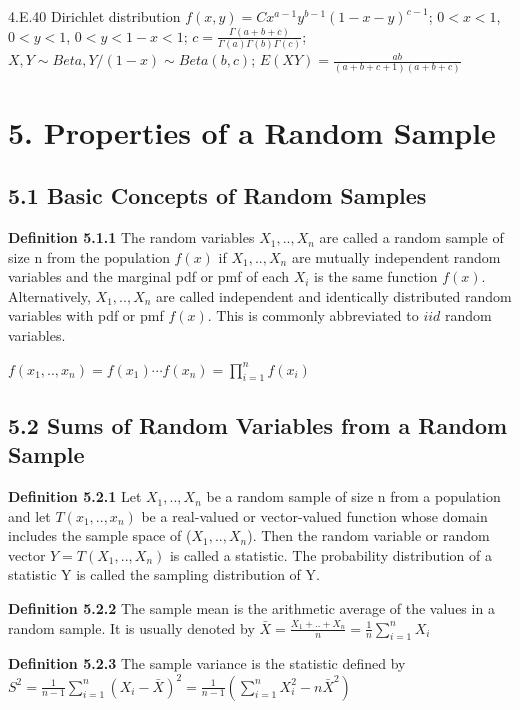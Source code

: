 \documentclass[10pt,twocolumn,portrait]{article}
\begin{document}
4.E.40 Dirichlet distribution \(f(x,y)=Cx^{a-1}y^{b-1}(1-x-y)^{c-1}\);
\(0<x<1\), \(0<y<1\), \(0<y<1-x<1\);
\(c=\frac{\Gamma(a+b+c)}{\Gamma(a)\Gamma(b)\Gamma(c)}\);
\(X,Y\sim Beta, Y/(1-x)\sim Beta(b,c)\);
\(E(XY)=\frac{ab}{(a+b+c+1)(a+b+c)}\)

\hypertarget{samp}{%
\section{5. Properties of a Random Sample}\label{samp}}

\hypertarget{basic-concepts-of-random-samples}{%
\subsection{5.1 Basic Concepts of Random
Samples}\label{basic-concepts-of-random-samples}}

\textbf{Definition 5.1.1} The random variables \(X_1,..,X_n\) are called
a random sample of size n from the population \(f(x)\) if \(X_1,..,X_n\)
are mutually independent random variables and the marginal pdf or pmf of
each \(X_i\) is the same function \(f(x)\). Alternatively,
\(X_1,..,X_n\) are called independent and identically distributed random
variables with pdf or pmf \(f(x)\). This is commonly abbreviated to
\(iid\) random variables.

\(f(x_1,..,x_n) =f(x_1)\cdots f(x_n)=\prod_{i=1}^nf(x_i)\)

\hypertarget{sums-of-random-variables-from-a-random-sample}{%
\subsection{5.2 Sums of Random Variables from a Random
Sample}\label{sums-of-random-variables-from-a-random-sample}}

\textbf{Definition 5.2.1} Let \(X_1,..,X_n\) be a random sample of size
n from a population and let \(T(x_1,..,x_n)\) be a real-valued or
vector-valued function whose domain includes the sample space of
(\(X_1,..,X_n\)). Then the random variable or random vector
\(Y=T(X_1,..,X_n)\) is called a statistic. The probability distribution
of a statistic Y is called the sampling distribution of Y.

\textbf{Definition 5.2.2} The sample mean is the arithmetic average of
the values in a random sample. It is usually denoted by
\(\bar X=\frac{X_1+..+X_n}{n}=\frac1n\sum_{i=1}^nX_i\)

\textbf{Definition 5.2.3} The sample variance is the statistic defined
by
\(S^2=\frac1{n-1}\sum_{i=1}^n(X_i-\bar X)^2=\frac1{n-1}(\sum_{i=1}^nX_i^2-n\bar X^2)\)
\end{document}
